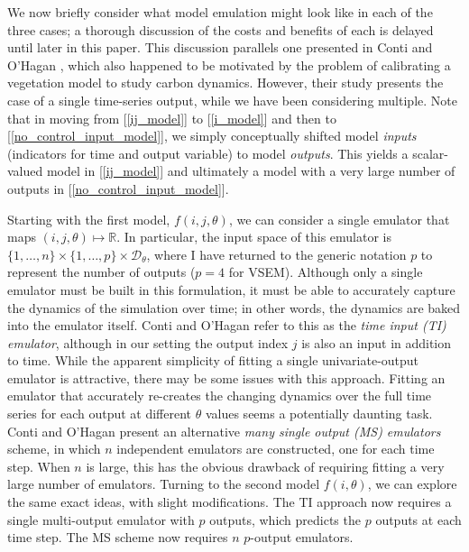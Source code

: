 \documentclass[12pt]{article}
\newcommand{\R}{\mathbb{R}}
\begin{document}
We now briefly consider what model emulation might look like in each of the three cases; a thorough discussion of the costs and benefits of each 
is delayed until later in this paper. This discussion parallels one presented in 
Conti and O'Hagan \cite{Conti}, which also happened to be motivated by the problem of calibrating a vegetation model to study 
carbon dynamics. However, their study presents the case of a single time-series output, while we have been considering multiple. 
Note that in moving from [\ref{ij_model}] to 
[\ref{i_model}] and then to [\ref{no_control_input_model}], we simply conceptually shifted model \textit{inputs} (indicators for time and 
output variable) to model \textit{outputs}. This yields a scalar-valued model in [\ref{ij_model}] and ultimately a model with a very large 
number of outputs in [\ref{no_control_input_model}]. 

Starting with the first model, $f(i, j, \theta)$, we can consider a single emulator that maps $(i, j, \theta) \mapsto \R$. In particular, the input space of this 
emulator is $\{1, \dots, n\} \times \{1, \dots, p\} \times \mathcal{D}_{\theta}$, where I have returned to the generic notation $p$ to represent the number 
of outputs ($p = 4$ for VSEM). Although only a single emulator must be built in this formulation, it must be able to accurately capture the dynamics of the
simulation over time; in other words, the dynamics are baked into the emulator itself. Conti and O'Hagan \cite{Conti} refer to this as the 
\textit{time input (TI) emulator}, although in our setting the output index $j$ is also an input in addition to time. While the apparent simplicity of fitting a 
single univariate-output emulator is attractive, there may be some issues with this approach. Fitting an emulator that accurately re-creates the changing dynamics
over the full time series for each output at different $\theta$ values seems a potentially daunting task. Conti and O'Hagan present an alternative 
\textit{many single output (MS) emulators} scheme, in which $n$ independent emulators are constructed, one for each time step. When $n$ is large, this has the 
obvious drawback of requiring fitting a very large number of emulators. Turning to the second model $f(i, \theta)$, we can explore the same exact ideas, with slight modifications. 
The TI approach now requires a single multi-output 
emulator with $p$ outputs, which predicts the $p$ outputs at each time step. The MS scheme now requires $n$ $p$-output emulators. 
\end{document}

